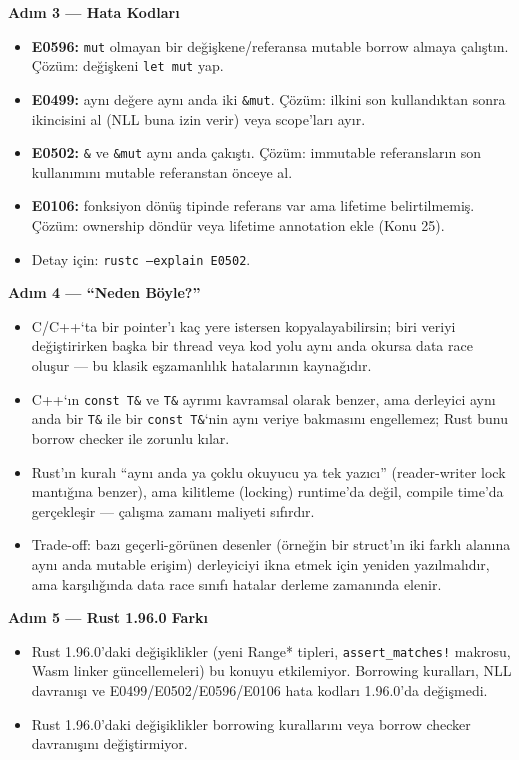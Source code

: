 \documentclass[12pt,a4paper]{article}
\begin{document}
\textbf{Adım 3 --- Hata Kodları}

\begin{itemize}
\tightlist
\item
  \textbf{E0596:} \texttt{mut} olmayan bir değişkene/referansa mutable borrow almaya çalıştın. Çözüm: değişkeni \texttt{let\ mut} yap.
\item
  \textbf{E0499:} aynı değere aynı anda iki \texttt{\&mut}. Çözüm: ilkini son kullandıktan sonra ikincisini al (NLL buna izin verir) veya scope'ları ayır.
\item
  \textbf{E0502:} \texttt{\&} ve \texttt{\&mut} aynı anda çakıştı. Çözüm: immutable referansların son kullanımını mutable referanstan önceye al.
\item
  \textbf{E0106:} fonksiyon dönüş tipinde referans var ama lifetime belirtilmemiş. Çözüm: ownership döndür veya lifetime annotation ekle (Konu 25).
\item
  Detay için: \texttt{rustc\ --explain\ E0502}.
\end{itemize}

\textbf{Adım 4 --- ``Neden Böyle?''}

\begin{itemize}
\tightlist
\item
  C/C++`ta bir pointer'ı kaç yere istersen kopyalayabilirsin; biri veriyi değiştirirken başka bir thread veya kod yolu aynı anda okursa data race oluşur --- bu klasik eşzamanlılık hatalarının kaynağıdır.
\item
  C++`ın \texttt{const\ T\&} ve \texttt{T\&} ayrımı kavramsal olarak benzer, ama derleyici aynı anda bir \texttt{T\&} ile bir \texttt{const\ T\&}`nin aynı veriye bakmasını engellemez; Rust bunu borrow checker ile zorunlu kılar.
\item
  Rust'ın kuralı ``aynı anda ya çoklu okuyucu ya tek yazıcı'' (reader-writer lock mantığına benzer), ama kilitleme (locking) runtime'da değil, compile time'da gerçekleşir --- çalışma zamanı maliyeti sıfırdır.
\item
  Trade-off: bazı geçerli-görünen desenler (örneğin bir struct'ın iki farklı alanına aynı anda mutable erişim) derleyiciyi ikna etmek için yeniden yazılmalıdır, ama karşılığında data race sınıfı hatalar derleme zamanında elenir.
\end{itemize}

\textbf{Adım 5 --- Rust 1.96.0 Farkı}

\begin{itemize}
\tightlist
\item
  Rust 1.96.0'daki değişiklikler (yeni Range* tipleri, \texttt{assert\_matches!} makrosu, Wasm linker güncellemeleri) bu konuyu etkilemiyor. Borrowing kuralları, NLL davranışı ve E0499/E0502/E0596/E0106 hata kodları 1.96.0'da değişmedi.
\item
  Rust 1.96.0'daki değişiklikler borrowing kurallarını veya borrow checker davranışını değiştirmiyor.
\end{itemize}
\end{document}
